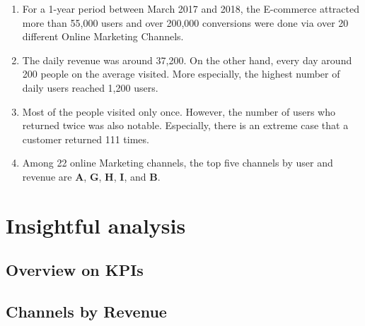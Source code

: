 \documentclass{article}
\begin{document}
\begin{multicols}{2}

\begin{enumerate} 
\item For a 1-year period between March 2017 and 2018, the E-commerce attracted more than 55,000 users and over 200,000 conversions were done via over 20 different Online Marketing Channels.

\item The daily revenue was around 37,200. On the other hand, every day around 200 people on the average visited. More especially, the highest number of daily users reached 1,200 users. %


\item Most of the people visited only once. However, the number of users who returned twice was also notable. Especially, there is an extreme case that a customer returned 111 times.

\item Among 22 online Marketing channels, the top five channels by user and revenue are \textbf{A}, \textbf{G}, \textbf{H}, \textbf{I}, and \textbf{B}.
\end{enumerate}
\section{Insightful analysis}\label{sec: Insightful analysis}
\subsection{Overview on KPIs}



\subsection{Channels by Revenue}


\end{multicols}
\end{document}

